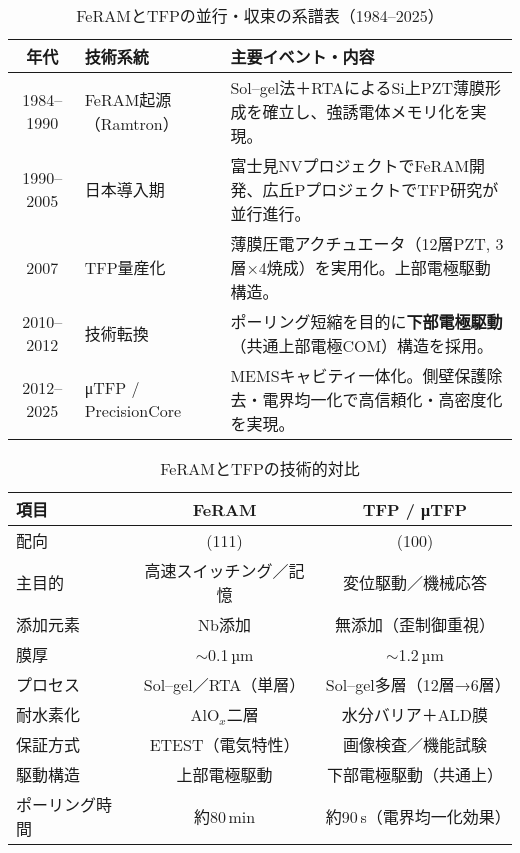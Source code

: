 \documentclass[conference]{IEEEtran}
\begin{document}
\begin{table}[!t]
\centering
\caption{FeRAMとTFPの並行・収束の系譜表（1984–2025）}
\label{tab:timeline}
\renewcommand{\arraystretch}{1.15}
\begin{tabular}{@{}cll@{}}
\toprule
\textbf{年代} & \textbf{技術系統} & \textbf{主要イベント・内容} \\ \midrule
1984--1990 & FeRAM起源（Ramtron） &
Sol--gel法＋RTAによるSi上PZT薄膜形成を確立し、強誘電体メモリ化を実現。\\[2pt]
1990--2005 & 日本導入期 &
富士見NVプロジェクトでFeRAM開発、広丘PプロジェクトでTFP研究が並行進行。\\[2pt]
2007 & TFP量産化 &
薄膜圧電アクチュエータ（12層PZT, 3層×4焼成）を実用化。上部電極駆動構造。\\[2pt]
2010--2012 & 技術転換 &
ポーリング短縮を目的に\textbf{下部電極駆動}（共通上部電極COM）構造を採用。\\[2pt]
2012--2025 & μTFP / PrecisionCore &
MEMSキャビティ一体化。側壁保護除去・電界均一化で高信頼化・高密度化を実現。\\
\bottomrule
\end{tabular}
\end{table}

\begin{table}[!t]
\centering
\caption{FeRAMとTFPの技術的対比}
\label{tab:compare}
\renewcommand{\arraystretch}{1.1}
\setlength{\tabcolsep}{2.4pt}
\scriptsize
\begin{tabular}{@{}lcc@{}}
\toprule
\textbf{項目} & \textbf{FeRAM} & \textbf{TFP / μTFP} \\
\midrule
配向 & (111) & (100) \\
主目的 & 高速スイッチング／記憶 & 変位駆動／機械応答 \\
添加元素 & Nb添加 & 無添加（歪制御重視） \\
膜厚 & $\sim$0.1\,µm & $\sim$1.2\,µm \\
プロセス & Sol--gel／RTA（単層） & Sol--gel多層（12層→6層） \\
耐水素化 & AlO$_x$二層 & 水分バリア＋ALD膜 \\
保証方式 & ETEST（電気特性） & 画像検査／機能試験 \\
駆動構造 & 上部電極駆動 & 下部電極駆動（共通上） \\
ポーリング時間 & 約80\,min & 約90\,s（電界均一化効果） \\
\bottomrule
\end{tabular}
\normalsize
\end{table}
\end{document}
